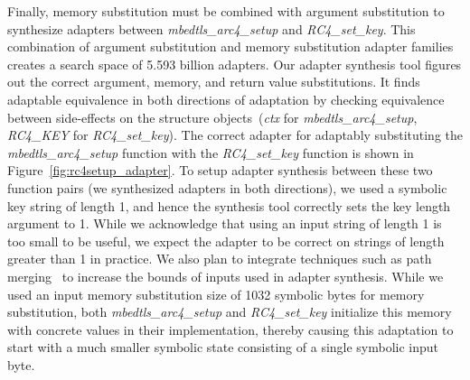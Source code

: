 Finally, memory substitution must be combined with argument substitution to synthesize adapters between \textit{mbedtls\_arc4\_setup} and \textit{RC4\_set\_key}.
%
This combination of argument substitution and memory substitution adapter families creates a search space of 5.593 billion adapters.
%
Our adapter synthesis tool figures out the correct argument,
memory, and return value substitutions.
%
It finds adaptable equivalence in both directions of adaptation by checking equivalence between side-effects on the structure objects~(\textit{ctx} for \textit{mbedtls\_arc4\_setup}, \textit{RC4\_KEY} for \textit{RC4\_set\_key}).
%
The correct adapter for adaptably substituting the
\textit{mbedtls\_arc4\_setup} function with the \textit{RC4\_set\_key}
function is shown in
Figure~\ref{fig:rc4setup_adapter}.
%
To setup adapter synthesis between these two function pairs (we synthesized adapters in both directions), we used a symbolic key string of length 1, and hence the synthesis tool correctly sets the key length argument to 1.
%
While we acknowledge that using an input string of length 1 is too small to be useful, we expect the adapter to be correct on strings of length greater than 1 in practice.
%
We also plan to integrate techniques such as path merging~\cite{KuznetsovKBC2012,AvgerinosRCB2014} to increase the bounds of inputs used in adapter synthesis.
%
While we used an input memory substitution size of 1032 symbolic bytes for memory substitution, both \textit{mbedtls\_arc4\_setup} and \textit{RC4\_set\_key} initialize this memory with concrete values in their implementation, thereby causing this adaptation to start with a much smaller symbolic state consisting of a single symbolic input byte.

